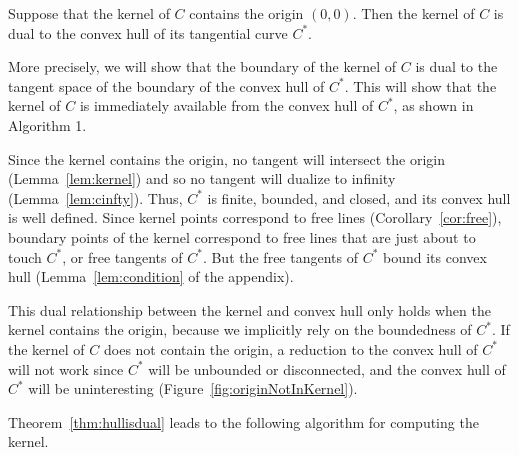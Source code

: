 \documentclass[12pt]{article}
\begin{document}
\begin{theorem}[Wang 02]
\label{thm:hullisdual}
Suppose that the kernel of $C$ contains the origin $(0,0)$.
Then the kernel of $C$ is dual to the convex hull of 
its tangential curve $C^*$.
\end{theorem}
\prf
More precisely, we will show that the boundary of the kernel of $C$ is dual 
to the tangent space of the boundary of the convex hull of $C^*$.
This will show that the kernel of $C$ is immediately available from the 
convex hull of $C^*$, as shown in Algorithm 1.

Since the kernel contains the origin, no tangent will intersect the origin
(Lemma~\ref{lem:kernel}) and so no tangent will dualize to infinity (Lemma~\ref{lem:cinfty}).
Thus, $C^*$ is finite, bounded, and closed,
and its convex hull is well defined.
Since kernel points correspond to free lines (Corollary~\ref{cor:free}),
boundary points of the kernel correspond to 
free lines that are just about to touch $C^*$, or free tangents of $C^*$.
But the free tangents of $C^*$ bound its convex hull (Lemma~\ref{lem:condition}
of the appendix).
\QED


This dual relationship between the kernel and convex hull 
only holds when the kernel contains the origin,
because we implicitly rely on the boundedness of $C^*$.
If the kernel of $C$ does not contain the origin, a reduction to the convex hull
of $C^*$ will not work since $C^*$ will be unbounded
or disconnected, and the convex hull of $C^*$
will be uninteresting (Figure~\ref{fig:originNotInKernel}).


Theorem~\ref{thm:hullisdual} leads to the following algorithm for computing
the kernel.
	
\vspace{.2in}
\end{document}
